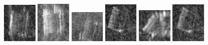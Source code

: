 \begin{figure}
    \includegraphics[width=0.15\textwidth]{chapters/images/dataset/all-class-images/can/can-157.jpg}
    \includegraphics[width=0.15\textwidth]{chapters/images/dataset/all-class-images/can/can-90.jpg}
    \includegraphics[width=0.15\textwidth]{chapters/images/dataset/all-class-images/can/can-85.jpg}
    \includegraphics[width=0.15\textwidth]{chapters/images/dataset/all-class-images/can/can-318.jpg}
    \includegraphics[width=0.15\textwidth]{chapters/images/dataset/all-class-images/can/can-73.jpg}
    \includegraphics[width=0.15\textwidth]{chapters/images/dataset/all-class-images/can/can-316.jpg}
    

\end{figure}
